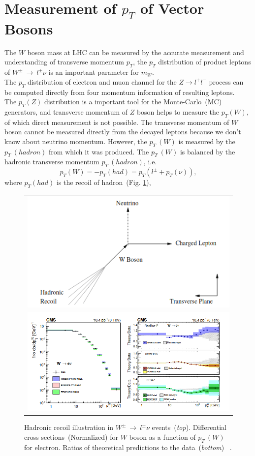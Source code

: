\section{Measurement of $p_{T}$ of Vector Bosons}
The $W$ boson mass at LHC can be measured by the accurate measurement and understanding of transverse momentum $p_{T}$, the $p_{T}$ distribution of product leptons of $W^{\pm}~\rightarrow~l^{\pm}\nu$ is an important parameter for $m_{W}$.\\
The $p_{T}$ distribution of electron and muon channel for the $Z\rightarrow l^{+}l^{-}$ process can be computed directly from four momentum information of resulting leptons.\\
The $p_{T}(Z)$ distribution is a important tool for the Monte-Carlo~(MC) generators, and transverse momentum of $Z$ boson helps to measure the $p_{T}(W)$, of which direct measurement is not possible.
The transverse momentum of  $W$ boson cannot be measured directly from the decayed leptons because we don't know about neutrino momentum. However, the $p_{T}~(W)$ is measured by the $p_{T}~(hadron)$ from which it was produced. The $p_{T}~(W)$ is balanced by the hadronic transverse momentum $p_{T}~(hadron)$, i.e.
\begin{equation}
p_{T}(W)=-p_{T}(had)=p_{T}(l^{\pm}+p_{T}(\nu)),
\end{equation}
where $p_{T}(had)$ is the recoil of hadron~(Fig. \ref{pt-w}),
\begin{figure}[h!]
\centering
\begin{tabular}{c}
\includegraphics[scale=0.8]{chapter3/pt.png}\\
\includegraphics[scale=0.5]{chapter3/ptw.png}
\end{tabular}
\caption{Hadronic recoil illustration in $W^{\pm}~\rightarrow~ l^{\pm}\nu$ events~(\textit{top}). Differential cross sections~(Normalized) for $W$ boson as a function of $p_{T}~(W)$ for electron. Ratios of theoretical predictions to the data~(\textit{bottom}) ~\cite{Khachatryan_2017}.}
\label{pt-w}
\end{figure}
